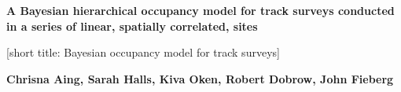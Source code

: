 \documentclass[11pt]{article}
\begin{document}
\addtolength{\textheight}{+0.18in}

\newcommand{\lf}{\left\lfloor}
\newcommand{\rf}{\right\rfloor}
\newcommand{\dis}{\displaystyle}
\newcommand{\sums}[2]{\sum_{\stackrel{{\scriptstyle {#1}}}{{#2}}}}
\newcommand{\prods}[2]{\prod_{\stackrel{{\scriptstyle {#1}}}{{#2}}}}

\long{}

\def\prbox{\hfill\rule{1.2ex}{1.2ex}\vspace{.2in}}

\newenvironment{proof}{\noindent{\bf Proof }}{\prbox}

\def\Reals{\hbox{\rm I\kern-.18em R}}
\def\reals{\Reals}
\def\Complexes{\hbox{\rm C\kern-.43em
       \vrule depth 0ex height 1.4ex width .05em\kern.41em}}
\def\complexes{\Complexes}

\def\field{\hbox{\rm I\kern-.18em F}} %
\def\Naturals{\hbox{\rm I\kern-.17em N}}
\def\naturals{\Naturals}
\def\integers{\hbox{\rm Z\kern-.3em Z}}
\def\hh{\hrule height0.9pt width1.1em}
\def\vv{\vrule width0.8pt depth0.12em height0.92em}
\def\square{\vbox{\kern0.15em\hh\kern0.9em\hh\kern-1.05em
            \hbox{\vv\kern0.93em\vv}}}
\def\Lv{L_{\alpha} }
\def\Lvp{L_{\alpha'} }
\def\sm{{\mbox{\boldmath $\sigma$}_m}}
\def\MMv{R_{\mbox{\boldmath $\sigma$}_v}}
\def\tMMv{\widetilde{R}_{\mbox{\boldmath $\sigma$}_v}}
\def\MMm{R_{\mbox{\boldmath $\sigma$}_m}}
\def\tMMm{\widetilde{R}_{\mbox{\boldmath $\sigma$}_m}}
\def\MMj{R_{\mbox{\boldmath $\sigma$}_j}}
\def\sn1{{\mbox{\boldmath $\sigma$}_{n-1}}}
\def\snv{{\mbox{\boldmath $\sigma$}_v}}


\LARGE\bf
\noindent
\textsf{A Bayesian hierarchical occupancy model for track surveys conducted in
a series of linear, spatially correlated, sites}

\rm\large
\vspace{2ex}
\noindent
\textsf{[short title: Bayesian occupancy model for track surveys]}

\rm\large
\normalsize

\vspace{4ex}
\small\bf
\noindent
\textsf{Chrisna Aing\footnotemark[1], Sarah Halls\footnotemark[1], Kiva
Oken\footnotemark[1], Robert Dobrow\footnotemark[1],
John Fieberg \footnotemark[2]}
\end{document}
